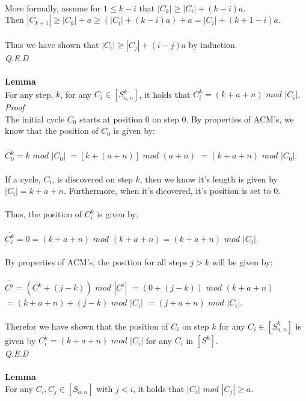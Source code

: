 \documentclass[a4paper,12pt]{article}
\begin{document}
\\
More formally, assume for $1 \leq k - i$ that $|C_k| \geq |C_i| + (k-i)a$.\\
Then $|C_{k+1}| \geq |C_k| + a \geq (|C_i| + (k-i)a) + a = |C_i| + (k + 1 - i)a$.\\
\\
Thus we have shown that $|C_{i}| \geq |C_j| + (i - j)a$ by induction.\\
\textit{Q.E.D}\\
\\
\textbf{Lemma}\\
For any step, $k$, for any $C_i \in [S^k_{a,n}]$, it holds that $\overline{C^k_i} = (k + a + n)$ $mod$ $|C_i|$.\\
\textit{Proof}\\  
The initial cycle $C_0$ starts at position $0$ on step $0$. By properties of ACM's, we know that the position of $C_0$ is given by:\\
\\
$\overline{C^k_0} = k$ $mod$ $|C_0| $
$= [k +(a + n)]$ $mod$ $(a + n)$
$= (k + a + n)$ $mod$ $|C_0|$.\\
\\
If a cycle, $C_i$, is discovered on step $k$, then we know it's length is given by $|C_i| = k + a + n$. Furthermore, when it's dicovered, it's position is set to 0.\\
\\
Thus, the position of $C^k_i$ is given by:\\
\\
$\overline{C^k_i} = 0 = (k + a + n)$ $mod$ $(k + a + n) = (k + a + n)$ $mod$ $|C_i|$.\\
\\
By properties of ACM's, the position for all steps $j > k$ will be given by:\\
\\
$\overline{C^j} = (\overline{C^k} + (j - k))$ $mod$ $|C^i|$
$= (0 + (j-k))$ $mod$ $(k + a + n)$\\
$= (k + a +n) + (j-k)$ $mod$ $|C_i| $
$= (j + a + n)$ $mod$ $|C_i|$.\\
\\
Therefor we have shown that the position of $C_i$ on step $k$ for any $C_i \in [S^k_{a,n}]$ is given by $\overline{C^k_i} = (k + a + n)$ $mod$ $|C_i|$ for any $C_i$ in $[S^k]$.\\
\textit{Q.E.D}\\
\\
\textbf{Lemma}\\
For any $C_i, C_j \in [S_{a,n}]$ with $j < i$, it holds that $|C_i|$ $mod$ $|C_j| \geq a$.\\
\end{document}
